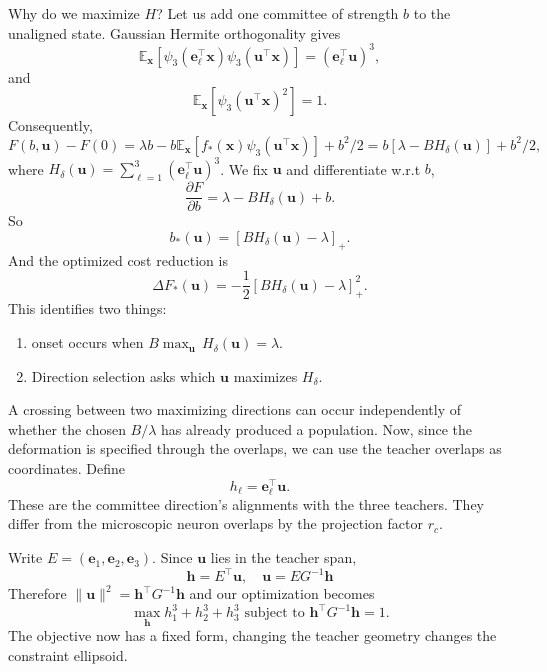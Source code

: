 \documentclass[11pt, reqno]{amsart}
\theoremstyle{notestyle}
\theoremstyle{defstyle}
\begin{document}
Why do we maximize $H$? Let us add one committee of strength $b$ to the unaligned state. Gaussian Hermite orthogonality gives
\begin{equation}
    \mathbb E_{\mathbf x}[\psi_3(\mathbf e_\ell^\top \mathbf x)\psi_3(\mathbf u^\top \mathbf x)] = (\mathbf e_\ell^\top \mathbf u)^3,
\end{equation}
and \begin{equation}
    \mathbb E_{\mathbf x}[\psi_3(\mathbf u^\top \mathbf x)^2] = 1.
\end{equation}
Consequently, 
\begin{equation}
    F(b, \mathbf u) - F(0) = \lambda b - b \mathbb E_{\mathbf x}[f_*(\mathbf x)\psi_3(\mathbf u^\top \mathbf x)] + b^2/2 = b[\lambda - BH_\delta(\mathbf u)] + b^2/2,
\end{equation}
where $H_\delta(\mathbf u) = \sum_{\ell=1}^3(\mathbf e_\ell^\top \mathbf u)^3$. We fix $\mathbf u$ and differentiate w.r.t $b$,
\begin{equation}
    \frac{\partial F}{\partial b} = \lambda - BH_\delta(\mathbf u) + b.
\end{equation}
So 
\begin{equation}
   b_*(\mathbf u) = [BH_\delta(\mathbf u) - \lambda]_+ .
\end{equation}
And the optimized cost reduction is 
\begin{equation}
    \Delta F_*(\mathbf u) = -\frac 12 [BH_\delta (\mathbf u) - \lambda]_+^2.
\end{equation}
This identifies two things:
\begin{enumerate}
    \item onset occurs when $B\max_{\mathbf u}\, H_\delta(\mathbf u) = \lambda.$
    \item Direction selection asks which $\mathbf u$ maximizes $H_\delta$.
\end{enumerate}
A crossing between two maximizing directions can occur independently of whether the chosen $B/\lambda$ has already produced a population. Now, since the deformation is specified through the overlaps, we can use the teacher overlaps as coordinates. Define
\begin{equation}
    h_\ell = \mathbf e_\ell^\top \mathbf u.
\end{equation}
These are the committee direction's alignments with the three teachers. They differ from the microscopic neuron overlaps by the projection factor $r_c$.

Write $E = (\mathbf e_1, \mathbf e_2, \mathbf e_3)$. Since $\mathbf u$ lies in the teacher span,
\begin{equation}
    \mathbf h = E^\top \mathbf u,\quad \mathbf u = EG^{-1}\mathbf h
\end{equation}
Therefore $\|\mathbf u\|^2 = \mathbf h^\top G^{-1}\mathbf h$ and our optimization becomes
\begin{equation}
\label{eq:opt}
    \max_{\mathbf h} h_1^3 +h_2^3 + h_3^3 \text{ subject to } \mathbf h^\top G^{-1}\mathbf h = 1.
\end{equation}
The objective now has a fixed form, changing the teacher geometry changes the constraint ellipsoid.
\end{document}
